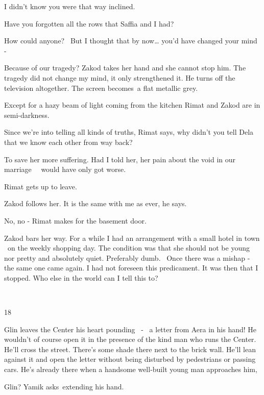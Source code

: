 \documentclass[12pt]{book}
\begin{document}
{\textquotedbl}I didn't know you were that way inclined.{\textquotedbl}

{\textquotedbl}Have you forgotten all the rows that Saffia and I had?{\textquotedbl}

{\textquotedbl}How could anyone? \ But I thought that by now{\dots} you'd have changed your mind -{\textquotedbl}

{\textquotedbl}Because of our tragedy?{\textquotedbl} Zakod takes her hand and she cannot stop him. {\textquotedbl}The
tragedy did not change my mind, it only strengthened it.{\textquotedbl} He turns off the television altogether. The
screen becomes~a flat metallic grey.

Except for a hazy beam of light coming
from the kitchen Rimat and
Zakod are in semi-darkness.

{\textquotedbl}Since we're into telling all kinds of truths,{\textquotedbl} Rimat says, {\textquotedbl}why didn't you
tell Dela that we know each other from way back?{\textquotedbl}

{\textquotedbl}To save her more suffering. Had I told her, her pain about the void in our marriage \ \ would have only
got worse.{\textquotedbl}

Rimat gets up to leave.

Zakod follows her. {\textquotedbl}It is the same with me as ever,{\textquotedbl} he says.

{\textquotedbl}No, no -{\textquotedbl} Rimat makes for the basement door.

Zakod bars her way. {\textquotedbl}For a while I had an arrangement with a small hotel in town \ on the weekly shopping
day. The condition was that she should not be young nor pretty and absolutely quiet. Preferably dumb. ~Once there was a
mishap - the same one came again. I had not foreseen this predicament. It was then that I stopped. Who else in the
world can I tell this to?{\textquotedbl}

~

18

Glin leaves the Center his heart pounding \ {}- \ a letter from Aera in his hand! He wouldn't of course open it in the
presence of the kind man who runs the Center. He'll cross the street. There's some shade there next to the brick wall.
He'll lean against it and open the letter without being disturbed by pedestrians or passing cars. He's already there
when a handsome well-built young man approaches him,~

{\textquotedbl}Glin?{\textquotedbl} Yamik asks~extending his hand.
\end{document}
